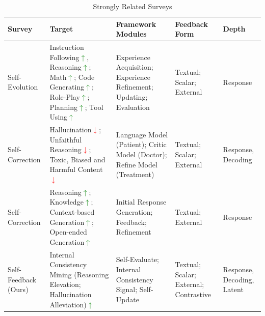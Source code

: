 \documentclass[lettersize,journal]{IEEEtran}
\begin{document}
\begin{table}[t!]
\caption{Strongly Related Surveys} \label{tab:related_surveys}
\begin{tabular}{p{}p{}p{}p{}p{}}
\toprule
Survey & Target & Framework Modules & Feedback Form & Depth \\
\midrule
Self-Evolution \cite{SelfEvolution_24_arXiv_PKU}  & Instruction Following\textcolor{green}{$\uparrow$}, Reasoning\textcolor{green}{$\uparrow$}; Math\textcolor{green}{$\uparrow$}; Code Generating\textcolor{green}{$\uparrow$}; Role-Play\textcolor{green}{$\uparrow$}; Planning\textcolor{green}{$\uparrow$}; Tool Using\textcolor{green}{$\uparrow$} & Experience Acquisition; Experience Refinement; Updating; Evaluation   & Textual; Scalar; External              & Response     \\
\midrule
Self-Correction \cite{SurveySelfCorrection_24_TACL_UCSB} & Hallucination\textcolor{red}{$\downarrow$}; Unfaithful Reasoning\textcolor{red}{$\downarrow$}; Toxic, Biased and Harmful Content\textcolor{red}{$\downarrow$}                  & Language Model (Patient); Critic Model (Doctor); Refine Model (Treatment) & Textual; Scalar; External              & Response, \newline Decoding      \\
\midrule
Self-Correction \cite{SurveySelfCorrection_24_arXiv_PSU} & Reasoning\textcolor{green}{$\uparrow$}; Knowledge\textcolor{green}{$\uparrow$}; Context-based Generation\textcolor{green}{$\uparrow$}; Open-ended Generation\textcolor{green}{$\uparrow$}                     & Initial Response Generation; Feedback; Refinement                     & Textual; External                      & Response      \\
\midrule
Self-Feedback (Ours) & Internal Consistency Mining (Reasoning Elevation; Hallucination Alleviation)\textcolor{green}{$\uparrow$}      & Self-Evaluate; Internal Consistency Signal; Self-Update                   & Textual; Scalar; External; Contrastive & Response, Decoding, Latent     \\
\bottomrule
\end{tabular}
\end{table}
\end{document}
